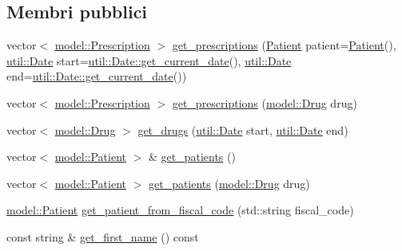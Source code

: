 \subsection*{Membri pubblici}
\begin{DoxyCompactItemize}
\item 
vector$<$ \mbox{\hyperlink{classmm_1_1model_1_1_prescription}{model\+::\+Prescription}} $>$ \mbox{\hyperlink{classmm_1_1model_1_1_doctor_a38a5a7d04ea625f39422cb320af18800}{get\+\_\+prescriptions}} (\mbox{\hyperlink{classmm_1_1model_1_1_patient}{Patient}} patient=\mbox{\hyperlink{classmm_1_1model_1_1_patient}{Patient}}(), \mbox{\hyperlink{structmm_1_1util_1_1_date}{util\+::\+Date}} start=\mbox{\hyperlink{structmm_1_1util_1_1_date_af0758fad7ef32fd535db3295136466eb}{util\+::\+Date\+::get\+\_\+current\+\_\+date}}(), \mbox{\hyperlink{structmm_1_1util_1_1_date}{util\+::\+Date}} end=\mbox{\hyperlink{structmm_1_1util_1_1_date_af0758fad7ef32fd535db3295136466eb}{util\+::\+Date\+::get\+\_\+current\+\_\+date}}())
\item 
vector$<$ \mbox{\hyperlink{classmm_1_1model_1_1_prescription}{model\+::\+Prescription}} $>$ \mbox{\hyperlink{classmm_1_1model_1_1_doctor_a76bf6b545709c7a784e4320b11f587bf}{get\+\_\+prescriptions}} (\mbox{\hyperlink{classmm_1_1model_1_1_drug}{model\+::\+Drug}} drug)
\item 
vector$<$ \mbox{\hyperlink{classmm_1_1model_1_1_drug}{model\+::\+Drug}} $>$ \mbox{\hyperlink{classmm_1_1model_1_1_doctor_ace64e6e74d0e39244c349fe5570ff974}{get\+\_\+drugs}} (\mbox{\hyperlink{structmm_1_1util_1_1_date}{util\+::\+Date}} start, \mbox{\hyperlink{structmm_1_1util_1_1_date}{util\+::\+Date}} end)
\item 
vector$<$ \mbox{\hyperlink{classmm_1_1model_1_1_patient}{model\+::\+Patient}} $>$ \& \mbox{\hyperlink{classmm_1_1model_1_1_doctor_a8b761c1dfbe10348eb99c0397e811e0a}{get\+\_\+patients}} ()
\item 
vector$<$ \mbox{\hyperlink{classmm_1_1model_1_1_patient}{model\+::\+Patient}} $>$ \mbox{\hyperlink{classmm_1_1model_1_1_doctor_a989fbde1a8784d8139d8add9066ab9b1}{get\+\_\+patients}} (\mbox{\hyperlink{classmm_1_1model_1_1_drug}{model\+::\+Drug}} drug)
\item 
\mbox{\hyperlink{classmm_1_1model_1_1_patient}{model\+::\+Patient}} \mbox{\hyperlink{classmm_1_1model_1_1_doctor_a89aa97cb00bfa2352c2a4f276554e738}{get\+\_\+patient\+\_\+from\+\_\+fiscal\+\_\+code}} (std\+::string fiscal\+\_\+code)
\item 
const string \& \mbox{\hyperlink{classmm_1_1model_1_1_doctor_ac33c8e6a13054d0c7aea1cf6aec4368f}{get\+\_\+first\+\_\+name}} () const

\end{DoxyCompactItemize}

